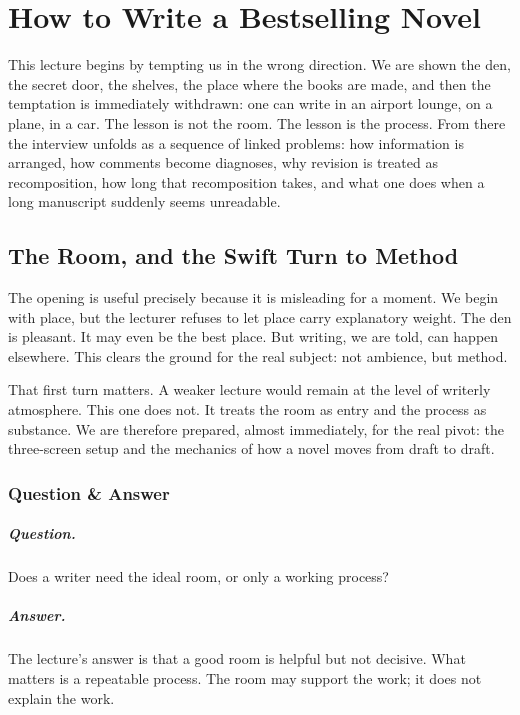\chapter{How to Write a Bestselling Novel}

This lecture begins by tempting us in the wrong direction. We are shown the den, the secret door, the shelves, the place where the books are made, and then the temptation is immediately withdrawn: one can write in an airport lounge, on a plane, in a car. The lesson is not the room. The lesson is the process. From there the interview unfolds as a sequence of linked problems: how information is arranged, how comments become diagnoses, why revision is treated as recomposition, how long that recomposition takes, and what one does when a long manuscript suddenly seems unreadable.

\section{The Room, and the Swift Turn to Method}

The opening is useful precisely because it is misleading for a moment. We begin with place, but the lecturer refuses to let place carry explanatory weight. The den is pleasant. It may even be the best place. But writing, we are told, can happen elsewhere. This clears the ground for the real subject: not ambience, but method.

That first turn matters. A weaker lecture would remain at the level of writerly atmosphere. This one does not. It treats the room as entry and the process as substance. We are therefore prepared, almost immediately, for the real pivot: the three-screen setup and the mechanics of how a novel moves from draft to draft.

\subsection{Question \& Answer}

\paragraph{Question.} Does a writer need the ideal room, or only a working process?

\paragraph{Answer.} The lecture's answer is that a good room is helpful but not decisive. What matters is a repeatable process. The room may support the work; it does not explain the work.

